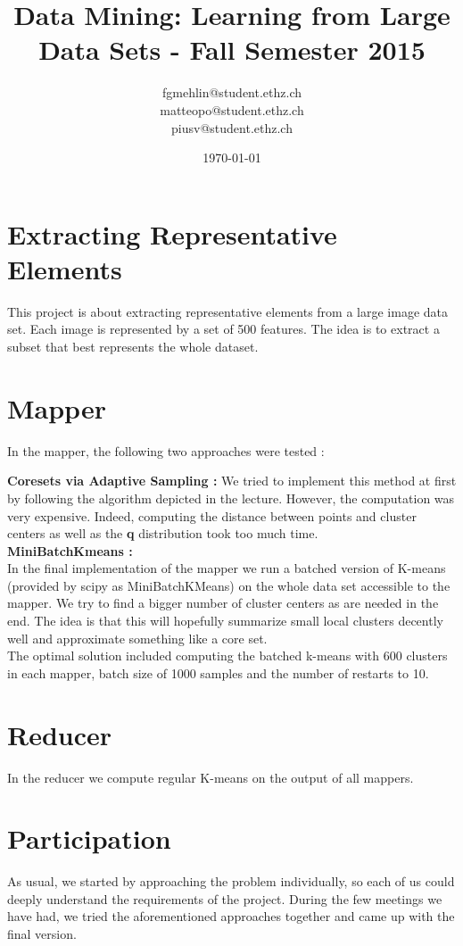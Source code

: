 \documentclass[a4paper, 11pt]{article}
\title{Data Mining: Learning from Large Data Sets - Fall Semester 2015}
\author{fgmehlin@student.ethz.ch\\ matteopo@student.ethz.ch\\ piusv@student.ethz.ch\\}
\date{\today}
\begin{document}
\maketitle

\section*{Extracting Representative Elements} 
This project is about extracting representative elements from a large image data set. Each image is represented by a set of 500 features. The idea is to extract a subset that best represents the whole dataset.

\section{Mapper}

In the mapper, the following two approaches were tested :

\textbf{Coresets via Adaptive Sampling :} We tried to implement this method at first by following the algorithm depicted in the lecture. However, the computation was very expensive. Indeed, computing the distance between points and cluster centers as well as the \textbf{q} distribution took too much time. \\

\textbf{MiniBatchKmeans :}\\
In the final implementation of the mapper we run a batched version of K-means (provided by scipy as MiniBatchKMeans) on the whole data set accessible to the mapper. We try to find a bigger number
of cluster centers as are needed in the end. The idea is that this will hopefully
summarize small local clusters decently well and approximate something like a core set. \\

The optimal solution included computing the batched k-means with 600 clusters in each mapper, batch size of 1000 samples and the number of restarts to 10.

\section{Reducer}

In the reducer we compute regular K-means on the output of all mappers.

\section{Participation}

As usual, we started by approaching the problem individually, so each of us could deeply understand the requirements of the project. During the few meetings we have had, we tried the aforementioned approaches together and came up with the final version.
\end{document}
